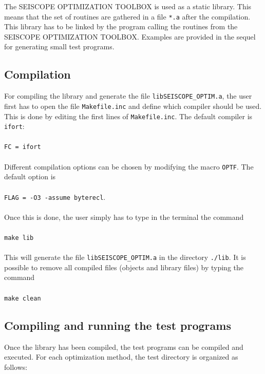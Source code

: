 \documentclass[a4paper,twoside,final,onecolumn,11pt,openright]{article}
\begin{document}
The SEISCOPE OPTIMIZATION TOOLBOX is used as a static library. This means that the set of routines are gathered in a file \texttt{*.a} after the compilation. This library has to be linked by the program calling the routines from the SEISCOPE OPTIMIZATION TOOLBOX. Examples are provided in the sequel for generating small test programs. 

\subsection{Compilation} 

For compiling the library and generate the file \texttt{libSEISCOPE\_OPTIM.a}, the user first has to open the file \texttt{Makefile.inc} and define which compiler should be used. This is done by editing the first lines of \texttt{Makefile.inc}. The default compiler is \texttt{ifort}:
\\
\\
\texttt{FC    =   ifort}
\\
\\
Different compilation options can be chosen by modifying the macro \texttt{OPTF}. The default option is 
\\
\\
\texttt{FLAG  =  -O3 -assume byterecl}. 
\\
\\
Once this is done, the user simply has to type in the terminal the command
\\
\\
\texttt{make lib}
\\
\\
This will generate the file \texttt{libSEISCOPE\_OPTIM.a} in the directory \texttt{./lib}. It is possible to remove all compiled files (objects and library files) by typing the command
\\
\\
\texttt{make clean}

\subsection{Compiling and running the test programs}

Once the library has been compiled, the test programs can be compiled and executed. For each optimization method, the test directory is organized as follows:

\end{document}
